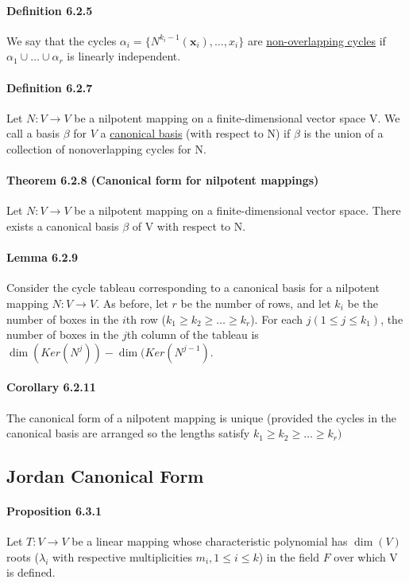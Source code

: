 \documentclass[11pt]{article}
\newcommand{\tb}[1]{\textbf{#1}}
\newcommand{\under}[1]{\underline{#1}}
\newcommand{\vx}[0]{\tb{x}}
\begin{document}
{\paragraph{Definition 6.2.5} We say that the cycles $\alpha_i = \{N^{k_i-1}(\vx_i),\hdots,x_i\}$ are \under{non-overlapping cycles} if $\alpha_1 \cup \hdots \cup \alpha_r$ is linearly independent.
\paragraph{Definition 6.2.7} Let $N: V \rightarrow V$ be a nilpotent mapping on a finite-dimensional vector space V. We call a basis $\beta$ for $V$ a \under{canonical basis} (with respect to N) if $\beta$ is the union of a collection of nonoverlapping cycles for N.
\paragraph{Theorem 6.2.8 (Canonical form for nilpotent mappings)} Let $N: V \rightarrow V$ be a nilpotent mapping on a finite-dimensional vector space. There exists a canonical basis $\beta$ of V with respect to N.
\paragraph{Lemma 6.2.9} Consider the cycle tableau corresponding to a canonical basis for a nilpotent mapping $N: V \rightarrow V$. As before, let $r$ be the number of rows, and let $k_i$ be the number of boxes in the $i$th row ($k_1\geq k_2 \geq \hdots \geq k_r$). For each $j ( 1\leq j \leq k_1)$, the number of boxes in the $j$th column of the tableau is $\dim(Ker(N^j)) - \dim(Ker(N^{j-1})$. 
\paragraph{Corollary 6.2.11} The canonical form of a nilpotent mapping is unique (provided the cycles in the canonical basis are arranged so the lengths satisfy $k_1 \geq k_2 \geq \hdots \geq k_r)$
\subsection{Jordan Canonical Form}

\paragraph{Proposition 6.3.1} Let $T: V \rightarrow V$ be a linear mapping whose characteristic polynomial has $\dim(V)$ roots ($\lambda_i$ with respective multiplicities $m_i, 1 \leq i\leq k$) in the field $F$ over which V is defined.
}
\end{document}
